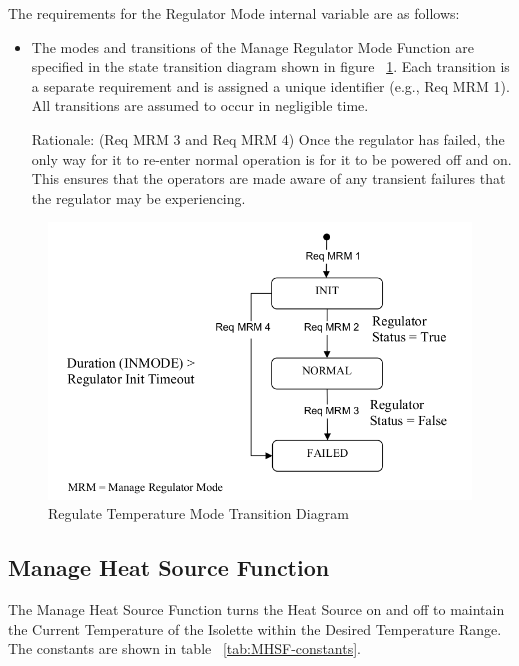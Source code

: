 The requirements for the Regulator Mode internal variable are as follows:

\begin{itemize}
\item The modes and transitions of the Manage Regulator Mode Function are specified in the
      state transition diagram shown in figure ~\ref{fig:RTMT-diagram}. Each transition is a separate requirement
      and is assigned a unique identifier (e.g., Req MRM 1). All transitions are assumed to
      occur in negligible time.

      Rationale: (Req MRM 3 and Req MRM 4) Once the regulator has failed, the only way
      for it to re-enter normal operation is for it to be powered off and on. This ensures that the
      operators are made aware of any transient failures that the regulator may be experiencing.
\end{itemize}

\begin{figure}[ht]
  \centerline{\includegraphics[width=\textwidth]{figures/regulate-temperature-mode-transition.png}}
  \vspace{-.4cm}
  \caption{Regulate Temperature Mode Transition Diagram}
  \vspace{-.4cm}
 \label{fig:RTMT-diagram}
\end{figure}

\subsection{Manage Heat Source Function}
\label{subsec:manage-heat-source}

The Manage Heat Source Function turns the Heat Source on and off to maintain the Current
Temperature of the Isolette within the Desired Temperature Range. The constants are shown in
table ~\ref{tab:MHSF-constants}.

